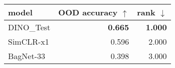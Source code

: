 \begin{tabular}{lrr}
\toprule
     model & OOD accuracy $\uparrow$ & rank $\downarrow$ \\
\midrule
DINO\_Test &          \textbf{0.665} &    \textbf{1.000} \\
 SimCLR-x1 &                   0.596 &             2.000 \\
 BagNet-33 &                   0.398 &             3.000 \\
\bottomrule
\end{tabular}

